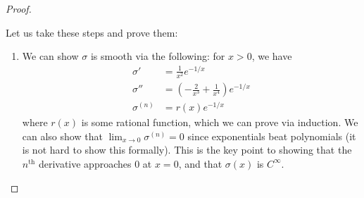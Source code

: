 \documentclass{article}
\begin{document}
\begin{proof}
\begin{enumerate}
\begin{center}
\begin{tikzpicture}
            \end{tikzpicture}
        \end{center}
    \end{enumerate}
    Let us take these steps and prove them: 
    \begin{enumerate}
        \item We can show $\sigma$ is smooth via the following: for $x>0$, we have
        \begin{align}
            \sigma' &= \frac{1}{x^2}e^{-1/x} \\ 
            \sigma'' &= (-\frac{2}{x^3}+\frac{1}{x^4})e^{-1/x} \\ 
            \sigma^{(n)} &= r(x)e^{-1/x}
        \end{align}
        where $r(x)$ is some rational function, which we can prove via induction. We can also show that $\lim_{x\to 0} \sigma^{(n)} = 0$ since exponentials beat polynomials (it is not hard to show this formally). This is the key point to showing that the $n^\text{th}$ derivative approaches $0$ at $x=0$, and that $\sigma(x)$ is $C^\infty.$
    \end{enumerate}
\end{proof}
\end{document}
